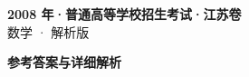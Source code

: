 \documentclass[zihao=-4, a4paper]{ctexart}
\begin{document}
\begin{center}
  {\Large\bfseries 2008 年·普通高等学校招生考试·江苏卷}\\[4pt]
  {\large 数学 · 解析版}
\end{center}
\medskip
{}

\clearpage
{}
\begin{center}{\Large\bfseries 参考答案与详细解析}\end{center}
\medskip

\end{document}
